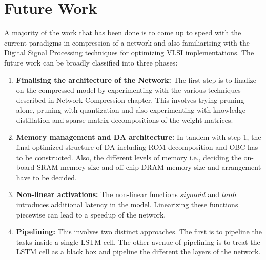 \chapter{Future Work}
A majority of the work that has been done is to come up to speed with the current paradigms in compression of a network and also familiarising with the Digital Signal Processing techniques for optimizing VLSI implementations. The future work can be broadly classified into three phases:
\begin{enumerate}
\item \textbf{Finalising the architecture of the Network:} The first step is to finalize on the compressed model by experimenting with the various techniques described in Network Compression chapter. This involves trying pruning alone, pruning with quantization and also experimenting with knowledge distillation and sparse matrix decompositions of the weight matrices.
\item \textbf{Memory management and DA architecture:} In tandem with step 1, the final optimized structure of DA including ROM decomposition and OBC has to be constructed. Also, the different levels of memory i.e., deciding the on-board SRAM memory size and off-chip DRAM memory size and arrangement have to be decided.
\item \textbf{Non-linear activations:} The non-linear functions $sigmoid$ and $tanh$ introduces additional latency in the model. Linearizing these functions piecewise can lead to a speedup of the network.
\item \textbf{Pipelining:} This involves two distinct approaches. The first is to pipeline the tasks inside a single LSTM cell. The other avenue of pipelining is to treat the LSTM cell as a black box and pipeline the different the layers of the network.
\end{enumerate}